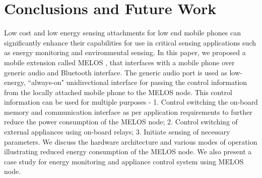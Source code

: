 \documentclass[10pt]{sigplan-proc-varsize}
\newcommand{\melos}{MELOS }
\begin{document}
%
%
%
%

\section{Conclusions and Future Work}
\label{sec:conc}
Low cost and low energy sensing attachments for low end mobile phones can significantly enhance their capabilities for use in critical sensing applications such as energy monitoring and environmental sensing. In this paper, we proposed a mobile extension called \melos, that interfaces with a mobile phone over generic audio and Bluetooth interface. The generic audio port is used as low-energy, ``always-on" unidirectional interface for passing the control information from the locally attached mobile phone to the \melos node. This control information can be used for multiple purposes - 1. Control switching the on-board memory and communication interface as per application requirements to further reduce the power consumption of the \melos node; 2. Control switching of external appliances using on-board relays; 3. Initiate sensing of necessary parameters.
We discuss the hardware architecture and various modes of operation illustrating reduced energy consumption of the \melos node. We also present a case study for energy monitoring and appliance control system using \melos node. 
\end{document}
